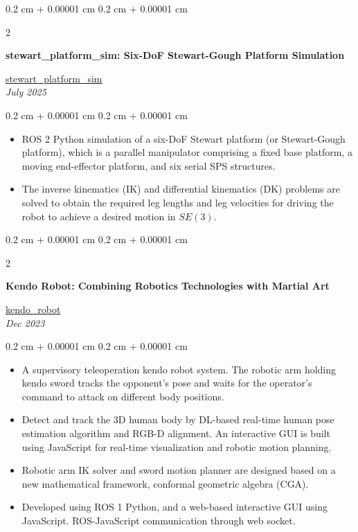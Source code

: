\documentclass[10pt, letterpaper]{article}
\newenvironment{highlights}{
    \begin{itemize}[
        topsep=0.10 cm,
        parsep=0.10 cm,
        partopsep=0pt,
        itemsep=0pt,
        leftmargin=0.4 cm + 10pt
    ]
}{
    \end{itemize}
} %
\newenvironment{onecolentry}{
    \begin{adjustwidth}{
        0.2 cm + 0.00001 cm
    }{
        0.2 cm + 0.00001 cm
    }
}{
    \end{adjustwidth}
} %
\newenvironment{twocolentry}[2][4.5 cm]{
    \needspace{4\baselineskip}%
    \onecolentry
    \def\secondColumn{#2}
    \setcolumnwidth{\fill, #1}
    \begin{paracol}{2}
}{
    \switchcolumn \raggedleft \secondColumn
    \end{paracol}
    \endonecolentry
} %
\let\hrefWithoutArrow\href
\renewcommand{\href}[2]{\hrefWithoutArrow{#1}{\ifthenelse{\equal{#2}{}}{ }{#2 }\raisebox{.15ex}{\footnotesize \faExternalLink*}}}
\begin{document}
        \begin{twocolentry}[4.9 cm]{
        \hrefWithoutArrow{https://github.com/wei-hsuan-cheng/stewart_platform_sim.git}{{\footnotesize\faGithub}\hspace*{0.13cm}stewart\_platform\_sim}\\\textit{July 2025}
        }
            \textbf{stewart\_platform\_sim: Six-DoF Stewart-Gough Platform Simulation}
        \end{twocolentry}
        \vspace{0.10 cm}
        \begin{onecolentry}
            \begin{highlights}
                \item ROS 2 Python simulation of a six-DoF Stewart platform (or Stewart-Gough platform), which is a parallel manipulator comprising a fixed base platform, a moving end-effector platform, and six serial SPS structures.
                \item The inverse kinematics (IK) and differential kinematics (DK) problems are solved to obtain the required leg lengths and leg velocities for driving the robot to achieve a desired motion in $SE(3)$.
            \end{highlights}
        \end{onecolentry}
        \vspace{0.2 cm}

        \begin{twocolentry}[4.9 cm]{
        \hrefWithoutArrow{https://github.com/wei-hsuan-cheng/kendo_robot}{{\footnotesize\faGithub}\hspace*{0.13cm}kendo\_robot}\\\textit{Dec 2023}
        }
            \textbf{Kendo Robot: Combining Robotics Technologies with Martial Art}
        \end{twocolentry}
        \vspace{0.10 cm}
        \begin{onecolentry}
            \begin{highlights}
                \item A supervisory teleoperation kendo robot system. The robotic arm holding kendo sword tracks the opponent’s pose and waits for the operator’s command to attack on different body positions.
                \item Detect and track the 3D human body by DL-based real-time human pose estimation algorithm and RGB-D alignment. An interactive GUI is built using JavaScript for real-time visualization and robotic motion planning.
                \item Robotic arm IK solver and sword motion planner are designed based on a new mathematical framework, conformal geometric algebra (CGA).
                \item Developed using ROS 1 Python, and a web-based interactive GUI using JavaScript. ROS-JavaScript communication through web socket.
            \end{highlights}
        \end{onecolentry}
        \vspace{0.2 cm}
\end{document}
